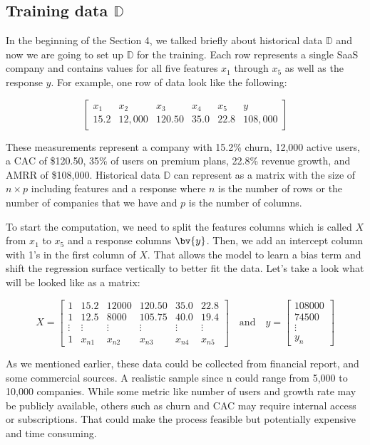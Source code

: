 \documentclass[12pt]{article}
\begin{document}
\subsection{Training data $\mathbb{D}$}

In the beginning of the Section 4, we talked briefly about historical data $\mathbb{D}$ and now we are going to set up $\mathbb{D}$ for the training. Each row represents a single SaaS company and contains values for all five features $x_1$ through $x_5$ as well as the response $y$. For example, one row of data look like the following:

\[
\begin{bmatrix}
x_1 & x_2 & x_3 & x_4 & x_5 & y \\
\hline
15.2 & 12{,}000 & 120.50 & 35.0 & 22.8 & 108{,}000
\end{bmatrix}
\]

These measurements represent a company with 15.2\% churn, 12,000 active users, a CAC of \$120.50, 35\% of users on premium plans, 22.8\% revenue growth, and AMRR of \$108,000. Historical data $\mathbb{D}$ can represent as a matrix with the size of $n \times p$ including features and a response where $n$ is the number of rows or the number of companies that we have and $p$ is the number of columns. 

To start the computation, we need to split the features columns which is called $X$ from $x_1$ to $x_5$ and a response columns $\bv{y}$. Then, we add an intercept column with 1's in the first column of $X$. That allows the model to learn a bias term and shift the regression surface vertically to better fit the data. Let's take a look what will be looked like as a matrix:


\[
X =
\begin{bmatrix}
1 & 15.2 & 12000 & 120.50 & 35.0 & 22.8 \\
1 & 12.5 & 8000 & 105.75 & 40.0 & 19.4 \\
\vdots & \vdots & \vdots & \vdots & \vdots & \vdots \\
1 & x_{n1} & x_{n2} & x_{n3} & x_{n4} & x_{n5}
\end{bmatrix}
\quad\text{and}\quad
y =
\begin{bmatrix}
108000 \\
74500 \\
\vdots \\
y_n
\end{bmatrix}
\]

As we mentioned earlier, these data could be collected from financial report, and some commercial sources. A realistic sample since n could range from 5,000 to 10,000 companies. While some metric like number of users and growth rate may be publicly available, others such as churn and CAC may require internal access or subscriptions. That could make the process feasible but potentially expensive and time consuming.
\end{document}
